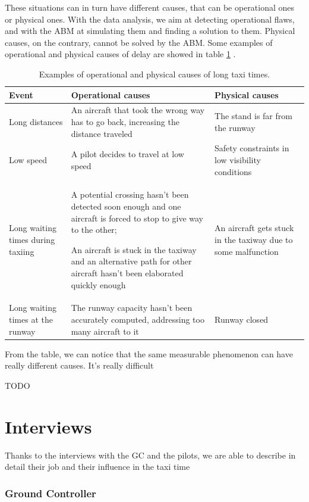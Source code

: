 \documentclass{article}
\begin{document}
These situations can in turn have different causes, that can be operational ones or physical ones. With the data analysis, we aim at detecting operational flaws, and with the ABM at simulating them and finding a solution to them. Physical causes, on the contrary, cannot be solved by the ABM.
Some examples of operational and physical causes of delay are showed in table \ref{causes} .
\begin{table}[h!!!!!!!!!!!!!!!]
	\begin{tabular}{|p{3cm}|p{4cm}|p{4cm}|}
		\hline
		\textbf{Event}& \textbf{Operational causes}& \textbf{Physical causes} \\
		\hline
		Long distances & An aircraft that took the wrong way has to go back, increasing the distance traveled & The stand is far from the runway \\
		\hline
		Low speed & A pilot decides to travel at low speed & Safety constraints in low visibility conditions\\
		\hline
		Long waiting times during taxiing & A potential crossing hasn't been detected soon enough and one aircraft is forced to stop to give way to the other; 
		
		An aircraft is stuck in the taxiway and an alternative path for other aircraft hasn't been elaborated quickly enough & An aircraft gets stuck in the taxiway due to some malfunction \\
		\hline
		Long waiting times at the runway & The runway capacity hasn't been accurately computed, addressing too many aircraft to it & Runway closed\\
		\hline
	\end{tabular}
	\caption{Examples of operational and physical causes of long taxi times.}
	\label{causes}
\end{table}

From the table, we can notice that the same measurable phenomenon can have really different causes. It's really difficult 

TODO

\newpage


\part{Interviews}
Thanks to the interviews with the GC and the pilots, we are able to describe in detail their job and their influence in the taxi time

\section{Ground Controller}
\end{document}

